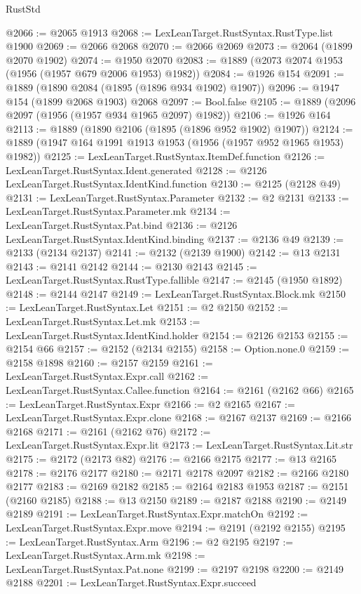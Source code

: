 \begin{lexlean}{RustStd}
\begin{coremodule}
@2066 := @2065 @1913
@2068 := LexLeanTarget.RustSyntax.RustType.list @1900
@2069 := @2066 @2068
@2070 := @2066 @2069
@2073 := @2064 (@1899 @2070 @1902)
@2074 := @1950 @2070
@2083 := @1889 (@2073 @2074 @1953 (@1956 (@1957 @679 @2006 @1953) @1982))
@2084 := @1926 @154
@2091 := @1889 (@1890 @2084 (@1895 (@1896 @934 @1902) @1907))
@2096 := @1947 @154 (@1899 @2068 @1903) @2068
@2097 := Bool.false
@2105 := @1889 (@2096 @2097 (@1956 (@1957 @934 @1965 @2097) @1982))
@2106 := @1926 @164
@2113 := @1889 (@1890 @2106 (@1895 (@1896 @952 @1902) @1907))
@2124 := @1889 (@1947 @164 @1991 @1913 @1953 (@1956 (@1957 @952 @1965 @1953) @1982))
@2125 := LexLeanTarget.RustSyntax.ItemDef.function
@2126 := LexLeanTarget.RustSyntax.Ident.generated
@2128 := @2126 LexLeanTarget.RustSyntax.IdentKind.function
@2130 := @2125 (@2128 @49)
@2131 := LexLeanTarget.RustSyntax.Parameter
@2132 := @2 @2131
@2133 := LexLeanTarget.RustSyntax.Parameter.mk
@2134 := LexLeanTarget.RustSyntax.Pat.bind
@2136 := @2126 LexLeanTarget.RustSyntax.IdentKind.binding
@2137 := @2136 @49
@2139 := @2133 (@2134 @2137)
@2141 := @2132 (@2139 @1900)
@2142 := @13 @2131
@2143 := @2141 @2142
@2144 := @2130 @2143
@2145 := LexLeanTarget.RustSyntax.RustType.fallible
@2147 := @2145 (@1950 @1892)
@2148 := @2144 @2147
@2149 := LexLeanTarget.RustSyntax.Block.mk
@2150 := LexLeanTarget.RustSyntax.Let
@2151 := @2 @2150
@2152 := LexLeanTarget.RustSyntax.Let.mk
@2153 := LexLeanTarget.RustSyntax.IdentKind.holder
@2154 := @2126 @2153
@2155 := @2154 @66
@2157 := @2152 (@2134 @2155)
@2158 := Option.none.{0}
@2159 := @2158 @1898
@2160 := @2157 @2159
@2161 := LexLeanTarget.RustSyntax.Expr.call
@2162 := LexLeanTarget.RustSyntax.Callee.function
@2164 := @2161 (@2162 @66)
@2165 := LexLeanTarget.RustSyntax.Expr
@2166 := @2 @2165
@2167 := LexLeanTarget.RustSyntax.Expr.clone
@2168 := @2167 @2137
@2169 := @2166 @2168
@2171 := @2161 (@2162 @76)
@2172 := LexLeanTarget.RustSyntax.Expr.lit
@2173 := LexLeanTarget.RustSyntax.Lit.str
@2175 := @2172 (@2173 @82)
@2176 := @2166 @2175
@2177 := @13 @2165
@2178 := @2176 @2177
@2180 := @2171 @2178 @2097
@2182 := @2166 @2180 @2177
@2183 := @2169 @2182
@2185 := @2164 @2183 @1953
@2187 := @2151 (@2160 @2185)
@2188 := @13 @2150
@2189 := @2187 @2188
@2190 := @2149 @2189
@2191 := LexLeanTarget.RustSyntax.Expr.matchOn
@2192 := LexLeanTarget.RustSyntax.Expr.move
@2194 := @2191 (@2192 @2155)
@2195 := LexLeanTarget.RustSyntax.Arm
@2196 := @2 @2195
@2197 := LexLeanTarget.RustSyntax.Arm.mk
@2198 := LexLeanTarget.RustSyntax.Pat.none
@2199 := @2197 @2198
@2200 := @2149 @2188
@2201 := LexLeanTarget.RustSyntax.Expr.succeed

\end{coremodule}
\end{lexlean}
